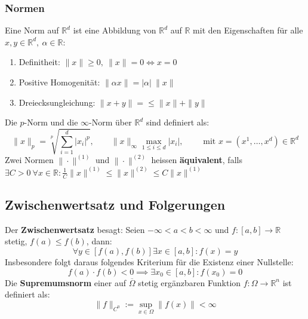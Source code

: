 \documentclass[a4paper,10pt]{scrartcl}
\begin{document}
\subsubsection{Normen}
Eine Norm auf $\mathbb{R}^d$ ist eine Abbildung von $\mathbb{R}^d$ auf $\mathbb{R}$ mit den Eigenschaften für alle $x,y\in \mathbb{R}^d, \ \alpha \in \mathbb{R}$: 
\begin{enumerate}[label=$\circ$]
	\item Definitheit: $\|x\|\geq 0, \ \|x\|=0\Leftrightarrow x=0$
	\item Positive Homogenität: $\|\alpha x\| = |\alpha|\ \|x\|$
	\item Dreiecksungleichung: $\|x+y\|=\leq \|x\|+\|y\|$
\end{enumerate}
Die $p$-Norm und die $\infty$-Norm über $\mathbb{R}^d$ sind definiert als: 
\begin{equation*}
	\|x\|_p = \sqrt[p]{\sum_{i=1}^{d}|x_i|^p}, \qquad
	\|x\|_\infty\max\limits_{1\leq i\leq d} |x_i|, \qquad 
	\text{ mit }
	x=(x^1, \dots, x^d)\in \mathbb{R}^d
\end{equation*}
Zwei Normen $\|\cdot\|^{(1)}$ und $\|\cdot \|^{(2)}$ heissen \textbf{äquivalent}, falls $\exists C>0\ \forall x\in \mathbb{R}: \frac{1}{C} \|x\|^{(1)}\leq \|x\|^{(2)} \leq C\|x\|^{(1)}$
\subsection{Zwischenwertsatz und Folgerungen}\label{Zwischenwertsatz}
Der \textbf{Zwischenwertsatz} besagt: Seien $-\infty<a<b<\infty$ und $f:[a,b]\to \mathbb{R}$ stetig, $f(a)\leq f(b)$, dann:
\begin{equation}
	\forall y \in\left[f(a), f(b)\right] \exists x\in[a,b]: f(x)=y
\end{equation}
Insbesondere folgt daraus folgendes Kriterium für die Existenz einer Nullstelle:
\begin{equation}
	f(a)\cdot f(b)<0\implies \exists x_0 \in[a,b]:f(x_0)=0
\end{equation}
Die \textbf{Supremumsnorm} einer auf $\overline{\Omega}$ stetig ergänzbaren Funktion $f:\Omega\to \mathbb{R}^n $ ist definiert als: 
\begin{equation}
	\|f\|_{C^0} := \sup\limits_{x\in\Omega} \|f(x)\| < \infty
\end{equation}
\end{document}
